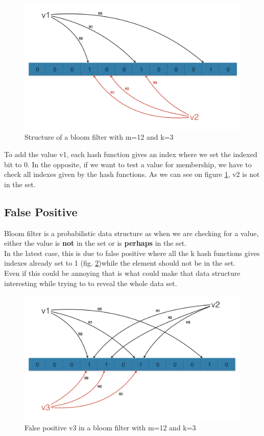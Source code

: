 \documentclass{eplmastersthesis}
\begin{document}
\begin{figure}[h!]
	\begin{center}
		\includegraphics[scale=0.3]{res/bloom-1}
		\caption{Structure of a bloom filter with m=12 and k=3}
		\label{bloom-1}
	\end{center}
\end{figure}

To add the value v1, each hash function gives an index where we set the indexed bit to 0. In the opposite, if we want to test a value for membership, we have to check all indexes given by the hash functions. As we can see on figure \ref{bloom-1}, v2 is not in the set.

\subsection{False Positive}

Bloom filter is a probabilistic data structure as when we are checking for a value, either the value is \textbf{not} in the set or is \textbf{perhaps} in the set. \\
In the latest case, this is due to false positive where all the k hash functions gives indexes already set to 1 (fig. \ref{bloom-2})while the element should not be in the set.\\
Even if this could be annoying that is what could make that data structure interesting while trying to to reveal the whole data set.
\begin{figure}[h!]
	\begin{center}
		\includegraphics[scale=0.3]{res/bloom-2}
		\caption{False positive v3 in a bloom filter with m=12 and k=3}
		\label{bloom-2}
	\end{center}
\end{figure}
\end{document}

